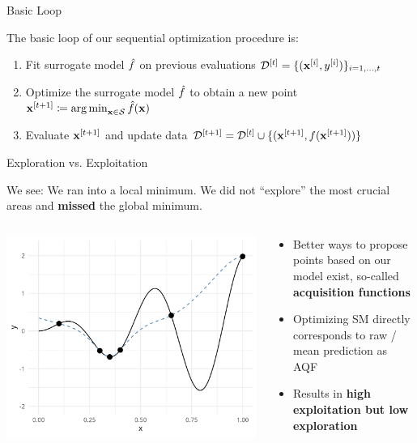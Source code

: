 \documentclass[11pt,compress,t,notes=noshow, xcolor=table]{beamer}
\begin{document}
\begin{vbframe}{Basic Loop}

The basic loop of our sequential optimization procedure is:
  \begin{enumerate}
    \item Fit surrogate model $\hat{f}$ on previous evaluations $\mathcal{D}^{[t]} = \{(\mathbf{x}^{[i]}, y^{[i]})\}_{i = 1, \ldots, t}$
    \item Optimize the surrogate model $\hat{f}$ to obtain a new point $\mathbf{x}^{[t+1]} \coloneqq \operatorname{arg\,min}_{\mathbf{x} \in \mathcal{S}} \hat{f}(\mathbf{x})$
    \item Evaluate $\mathbf{x}^{[t+1]}$ and update data $\mathcal{D}^{[t+1]} = \mathcal{D}^{[t]} \cup \{(\mathbf{x}^{[t+1]}, f(\mathbf{x}^{[t+1]}))\}$
  \end{enumerate}

\end{vbframe}

\begin{vbframe}{Exploration vs. Exploitation}

We see: We ran into a local minimum. We did not \enquote{explore} the most crucial areas and \textbf{missed} the global minimum.

\vspace*{0.5cm} 

\begin{columns}[T]
\begin{column}{0.5\textwidth}
  \includegraphics[width = \textwidth]{figure_man/loop_11.png}\end{column}
\begin{column}{0.5\textwidth}
\begin{itemize}
\item Better ways to propose points based on our model exist, so-called \textbf{acquisition functions}
  \item Optimizing SM directly corresponds to raw / mean prediction as AQF
  \item Results in \textbf{high exploitation but low exploration}
\end{itemize}
\end{column}


\end{columns}
\end{vbframe}
\end{document}
